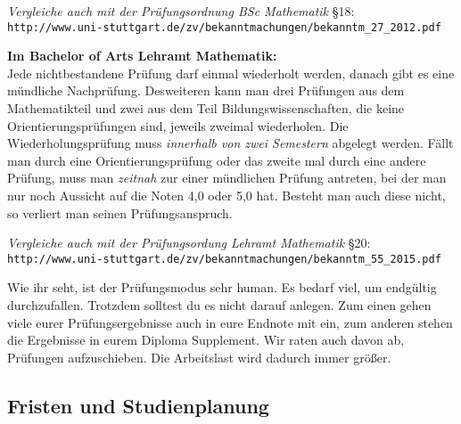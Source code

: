 {\it Vergleiche auch mit der Prüfungsordnung BSc Mathematik} §18:\\
{\small
\verb|http://www.uni-stuttgart.de/zv/bekanntmachungen/bekanntm_27_2012.pdf|}

{\bf Im Bachelor of Arts Lehramt Mathematik:}\\
Jede nichtbestandene Prüfung darf einmal wiederholt werden,
danach gibt es eine mündliche Nachprüfung.
Desweiteren kann man drei Prüfungen aus dem Mathematikteil
und zwei aus dem Teil Bildungswissenschaften,
die keine Orientierungsprüfungen sind,
jeweils zweimal wiederholen.
Die Wiederholungsprüfung muss {\it innerhalb
von zwei Semestern} abgelegt werden.
Fällt man durch eine Orientierungsprüfung
oder das zweite mal durch eine andere Prüfung,
muss man {\it zeitnah} zur einer mündlichen Prüfung antreten,
bei der man nur noch Aussicht auf die Noten 4,0 oder 5,0 hat.
Besteht man auch diese nicht,
so verliert man seinen Prüfungsanspruch.

{\it Vergleiche auch mit der Prüfungsordung Lehramt Mathematik} §20:\\
{\small
\verb|http://www.uni-stuttgart.de/zv/bekanntmachungen/bekanntm_55_2015.pdf|}

Wie ihr seht, ist der Prüfungsmodus sehr human.
Es bedarf viel, um endgültig durchzufallen.
Trotzdem solltest du es nicht darauf anlegen.
Zum einen gehen viele eurer Prüfungsergebnisse
auch in eure Endnote mit ein,
zum anderen stehen die Ergebnisse
in eurem \glqq Diploma Supplement\grqq.
Wir raten auch davon ab, Prüfungen aufzuschieben.
Die Arbeitslast wird dadurch immer größer.

\subsection{Fristen und Studienplanung}\label{ssec:fp}


